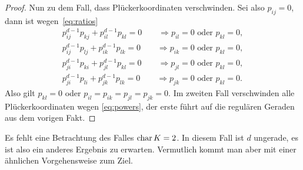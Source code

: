 \begin{proof}
Nun zu dem Fall, dass Plückerkoordinaten verschwinden. Sei also $p_{ij}=0$, dann ist wegen~\eqref{eq:ratios}
\begin{align*}
p_{ij}^{d-1}p_{kj} + p_{il}^{d-1}p_{kl} = 0 \qquad\Rightarrow p_{il} = 0 \text{ oder } p_{kl} = 0, \\
p_{ij}^{d-1}p_{lj} + p_{ik}^{d-1}p_{lk} = 0 \qquad\Rightarrow p_{ik} = 0 \text{ oder } p_{kl} = 0, \\
p_{ji}^{d-1}p_{ki} + p_{jl}^{d-1}p_{kl} = 0 \qquad\Rightarrow p_{jl} = 0 \text{ oder } p_{kl} = 0, \\
p_{ji}^{d-1}p_{li} + p_{jk}^{d-1}p_{lk} = 0 \qquad\Rightarrow p_{jk} = 0 \text{ oder } p_{kl} = 0.
\end{align*}
Also gilt $p_{kl} = 0$ oder $p_{il} = p_{ik} = p_{jl} = p_{jk} = 0$. Im zweiten Fall verschwinden alle Plückerkoordinaten wegen \eqref{eq:powers}, der erste führt auf die regulären Geraden aus dem vorigen Fakt.
\end{proof}
\begin{remarks}
Es fehlt eine Betrachtung des Falles $\operatorname{char} K = 2$. In diesem Fall ist $d$ ungerade, es ist also ein anderes Ergebnis zu erwarten. Vermutlich kommt man aber mit einer ähnlichen Vorgehensweise zum Ziel.
\end{remarks}

